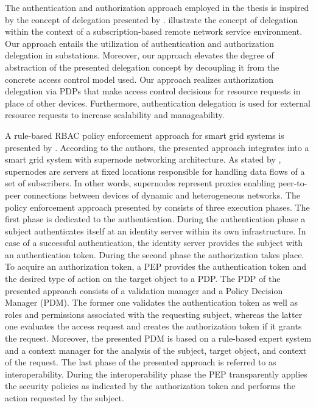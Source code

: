The authentication and authorization approach employed in the thesis is inspired by the concept of delegation presented by \citeauthor{Ma2006}.
\citeauthor{Ma2006} illustrate the concept of delegation within the context of a subscription-based remote network service environment.
Our approach entails the utilization of authentication and authorization delegation in substations.
Moreover, our approach elevates the degree of abstraction of the presented delegation concept by decoupling it from the concrete access control model used.
Our approach realizes authorization delegation via PDPs that make access control decisions for resource requests in place of other devices.
Furthermore, authentication delegation is used for external resource requests to increase scalability and manageability.

A rule-based RBAC policy enforcement approach for smart grid systems is presented by \citeauthor{Alcaraz2016} \cite{Alcaraz2016}.
According to the authors, the presented approach integrates into a smart grid system with supernode networking architecture.
As stated by \citeauthor{Samuel2008} \cite{Samuel2008}, supernodes are servers at fixed locations responsible for handling data flows of a set of subscribers.
In other words, supernodes represent proxies enabling peer-to-peer connections between devices of dynamic and heterogeneous networks.
The policy enforcement approach presented by \citeauthor{Alcaraz2016} consists of three execution phases.
The first phase is dedicated to the authentication.
During the authentication phase a subject authenticates itself at an identity server within its own infrastructure.
In case of a successful authentication, the identity server provides the subject with an authentication token.
During the second phase the authorization takes place.
To acquire an authorization token, a PEP provides the authentication token and the desired type of action on the target object to a PDP.
The PDP of the presented approach consists of a validation manager and a Policy Decision Manager (PDM).
The former one validates the authentication token as well as roles and permissions associated with the requesting subject, whereas the latter one evaluates the access request and creates the authorization token if it grants the request.
Moreover, the presented PDM is based on a rule-based expert system and a context manager for the analysis of the subject, target object, and context of the request.   
The last phase of the presented approach is referred to as interoperability.
During the interoperability phase the PEP transparently applies the security policies as indicated by the authorization token and performs the action requested by the subject.

